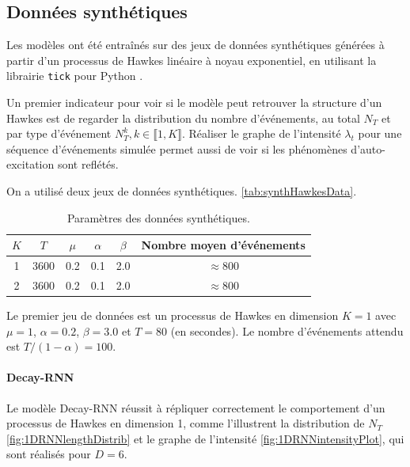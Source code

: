 \documentclass[../main.tex]{subfiles}
\begin{document}
\subsection{Données synthétiques}\label{ssec:synthResults}

Les modèles ont été entraînés sur des jeux de données synthétiques générées à partir d'un processus de Hawkes linéaire à noyau exponentiel, en utilisant la librairie \verb|tick| pour Python \cite{2017arXiv170703003B}.

Un premier indicateur pour voir si le modèle peut retrouver la structure d'un Hawkes est de regarder la distribution du nombre d'événements, au total $N_T$ et par type d'événement $N^k_T, k\in\llbracket 1,K\rrbracket$. Réaliser le graphe de l'intensité $\lambda_t$ pour une séquence d'événements simulée permet aussi de voir si les phénomènes d'auto-excitation sont reflétés.

On a utilisé deux jeux de données synthétiques. \autoref{tab:synthHawkesData}.

\begin{table}[h]
	\centering
	\begin{tabular}[]{cccccc}
		\toprule
		$K$ & $T$ & $\mu$ & $\alpha$ & $\beta$ & Nombre moyen d'événements \\ \hline\hline
		1 & 3600 & 0.2 & 0.1 & 2.0 & $\approx 800$ \\\hline
		2 & 3600 & 0.2 & 0.1 & 2.0 & $\approx 800$
	\end{tabular}
	\caption{Paramètres des données synthétiques.}\label{tab:synthHawkesData}
\end{table}

Le premier jeu de données est un processus de Hawkes en dimension $K=1$ avec $\mu=1$, $\alpha = \num{0.2}$, $\beta = \num{3.0}$ et $T = \num{80}$ (en secondes). Le nombre d'événements attendu est $T/(1-\alpha) = \num{100}$.

\paragraph{Decay-RNN}
Le modèle Decay-RNN réussit à répliquer correctement le comportement d'un processus de Hawkes en dimension 1, comme l'illustrent la distribution de $N_T$ \cref{fig:1DRNNlengthDistrib} et le graphe de l'intensité \cref{fig:1DRNNintensityPlot}, qui sont réalisés pour $D=6$.\footnotemark

\end{document}

